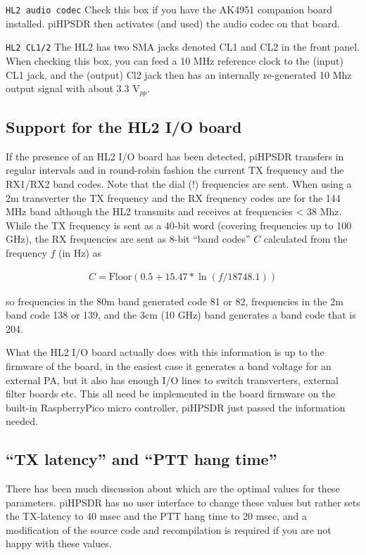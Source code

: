 \documentclass[12pt]{book}
\def\rett#1{\texttt{\color{red}#1}}
\def\pH{pi\-HPSDR\xspace}
\begin{document}
 \rett{HL2 audio codec} Check this box if you have the AK4951 companion board installed. \pH then activates
 (and used) the audio codec on that board.

 \rett{HL2 CL1/2} The HL2 has two SMA jacks denoted CL1 and CL2 in the front panel. When checking this box,
 you can feed a 10 MHz reference clock to the (input) CL1 jack, and the (output) Cl2 jack then
 has an internally re-generated 10 Mhz output signal with about 3.3 V$_{pp}$.

\subsection{Support for the HL2 I/O board}

If the presence of an HL2 I/O board has been detected,
\pH transfers in regular intervals and in round-robin fashion
the current TX frequency and the RX1/RX2 band codes. Note that the dial (!) frequencies are sent.
When using a 2m transverter the TX frequency and the RX frequency codes are for the
144 MHz band although the HL2 transmits and receives at frequencies < 38 Mhz.
 While the TX frequency is sent as a 40-bit word (covering frequencies up to 100 GHz),
the RX frequencies are sent as 8-bit  ``band codes'' $C$ calculated from the frequency $f$ (in Hz) as

\begin{align}
C = \textrm{Floor}\left( 0.5 + 15.47 * \ln(f / 18748.1)\right)
\end{align}

so frequencies in the 80m band generated code 81 or 82, frequencies in the 2m band code 138 or 139,
and the 3cm (10 GHz) band generates a band code that is 204.

What the HL2 I/O board actually does with this information is up to the firmware of the board, in the
easiest case it generates a band voltage for an external PA, but it also has enough I/O lines
to switch transverters, external filter boards etc. This all need be implemented in the board firmware
on the built-in RaspberryPico micro controller,
\pH just passed the information needed.

\subsection{``TX latency'' and ``PTT hang time''}

There has been much discussion about which are the optimal values for these parameters. \pH has no
user interface to change these values but rather sets the TX-latency to 40 msec and the PTT hang time to 20 msec,
and a modification of the source code and recompilation is required if you are not happy with these values.
\end{document}
